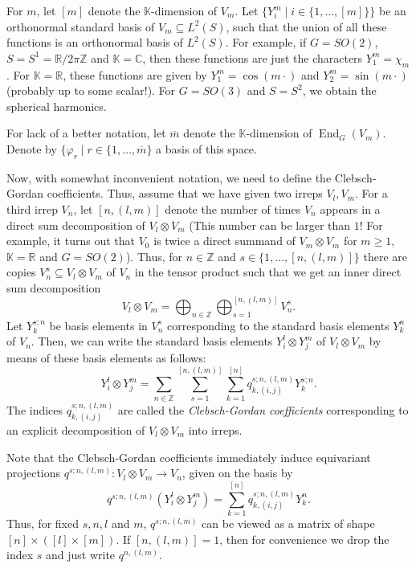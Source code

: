 \documentclass[12pt, a4paper]{article}
\theoremstyle{plain}
\theoremstyle{definition}
\theoremstyle{remark}
\newcommand{\Z}{\mathds{Z}}
\newcommand{\R}{\mathds{R}}
\newcommand{\C}{\mathds{C}}
\newcommand{\K}{\mathds{K}}
\DeclareMathOperator{\End}{End}
\begin{document}
For $m$, let $[m]$ denote the $\K$-dimension of $V_m$. Let $\{Y^m_i \mid i \in \{1, \dots, [m] \}\}$ be an orthonormal standard basis of $V_m \subseteq L^2(S)$, such that the union of all these functions is an orthonormal basis of $L^2(S)$. For example, if $G = SO(2)$, $S = S^1 = \R/{2\pi\Z}$ and $\K = \C$, then these functions are just the characters $Y^m_1 = \chi_{m}$. For $\K = \R$, these functions are given by $Y^m_1 = \cos(m\cdot)$ and $Y^m_2 = \sin(m \cdot)$ (probably up to some scalar!). For $G = SO(3)$ and $S = S^2$, we obtain the spherical harmonics.

For lack of a better notation, let $\overline{m}$ denote the $\K$-dimension of $\End_G(V_m)$. Denote by $\{ \varphi_r \mid r \in \{1 ,\dots, \overline{m} \}$ a basis of this space.

Now, with somewhat inconvenient notation, we need to define the Clebsch-Gordan coefficients. Thus, assume that we have given two irreps $V_l, V_m$. For a third irrep $V_n$, let $[n,(l,m)]$ denote the number of times $V_n$ appears in a direct sum decomposition of $V_l \otimes V_m$ (This number can be larger than $1$! For example, it turns out that $V_0$ is twice a direct summand of $V_m \otimes V_m$ for $m \geq 1$, $\K = \R$ and $G = SO(2)$). Thus, for $n \in \Z$ and $s \in \{1, \dots, [n,(l,m)]\}$ there are copies $V_n^s \subseteq V_l \otimes V_m$ of $V_n$ in the tensor product such that we get an inner direct sum decomposition
\begin{equation*}
V_l \otimes V_m = \bigoplus_{n \in \Z} \bigoplus_{s = 1}^{[n,(l,m)]} V_n^s.
\end{equation*}
Let $Y_k^{s;n}$ be basis elements in $V_n^s$ corresponding to the standard basis elements $Y_k^n$ of $V_n$. Then, we can write the standard basis elements $Y_i^l \otimes Y_j^m$ of $V_l \otimes V_m$ by means of these basis elements as follows:
\begin{equation*}
Y_i^l \otimes Y_j^m = \sum_{n \in \Z} \sum_{s = 1}^{[n, (l,m) ]} \sum_{k = 1}^{[n]} q_{k,(i,j)}^{s; n, (l,m)}Y_k^{s; n}.
\end{equation*}
The indices $q_{k,(i,j)}^{s;n,(l,m)}$ are called the \emph{Clebsch-Gordan coefficients} corresponding to an explicit decomposition of $V_l \otimes V_m$ into irreps.

Note that the Clebsch-Gordan coefficients immediately induce equivariant projections $q^{s;n,(l,m)}: V_l \otimes V_m \to V_n$, given on the basis by
\begin{equation*}
q^{s;n,(l,m)}(Y^l_i \otimes Y^m_j) = \sum_{k = 1}^{[n]} q_{k,(i,j)}^{s;n,(l,m)} Y_k^{n}.
\end{equation*}
Thus, for fixed $s,n,l$ and $m$, $q^{s;n,(l,m)}$ can be viewed as a matrix of shape $[n]\times ([l] \times [m])$. If $[n,(l,m)] = 1$, then for convenience we drop the index $s$ and just write $q^{n,(l,m)}$.
\end{document}
